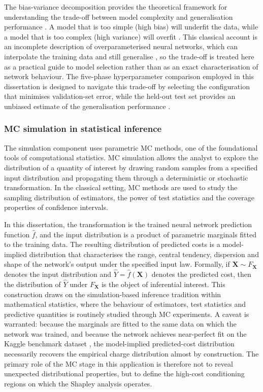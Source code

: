 The bias-variance decomposition provides the theoretical framework for
understanding the trade-off between model complexity and generalisation
performance \citep{hastie2009elements, james2021introduction}.  A model
that is too simple (high bias) will underfit the
data, while a model that is too complex (high variance) will overfit
\citep{abu2012learning, bishop2006pattern}.  This classical account is
an incomplete description of overparameterised neural networks, which can
interpolate the training data and still generalise
\citep{zhang2021understanding}, so the trade-off is treated here as a
practical guide to model selection rather than as an exact
characterisation of network behaviour.
The five-phase hyperparameter comparison employed in this dissertation is
designed to navigate this trade-off by selecting the configuration that
minimises validation-set error, while the held-out test set provides an
unbiased estimate of the generalisation performance
\citep{hastie2009elements, kadra2021welltuned}.

\subsubsection{MC simulation in statistical inference}
\label{sec:mc_intro}

The simulation component uses parametric MC methods, one of the
foundational tools of computational statistics.  MC simulation
allows the analyst to explore the distribution of a quantity of interest
by drawing random samples from a specified input distribution and
propagating them through a deterministic or stochastic transformation.
In the classical setting, MC methods are used to study the
sampling distribution of estimators, the power of test statistics and the
coverage properties of confidence intervals.

In this dissertation, the transformation is the trained neural network
prediction function $\hat{f}$, and the input distribution is a product of
parametric marginals fitted to the training data.  The resulting
distribution of predicted costs is a model-implied distribution that
characterises the range, central tendency, dispersion and shape of the
network's output under the specified input law.  Formally, if
$\mathbf{X} \sim F_{\mathbf{X}}$ denotes the input distribution and
$\hat{Y} = \hat{f}(\mathbf{X})$ denotes the predicted cost, then the
distribution of $\hat{Y}$ under $F_{\mathbf{X}}$ is the object of
inferential interest.  This construction draws on the simulation-based
inference tradition within mathematical statistics, where the behaviour
of estimators, test statistics and predictive quantities is routinely
studied through MC experiments.  A caveat is warranted: because
the marginals are fitted to the same data on which the network was
trained, and because the network achieves near-perfect fit on the
Kaggle benchmark dataset \citep{kaggleInsuranceDataML}, the model-implied predicted-cost distribution
necessarily recovers the empirical charge distribution almost by
construction.  The primary role of the MC stage in this
application is therefore not to reveal unexpected distributional
properties, but to define the high-cost conditioning regions on which
the Shapley analysis operates.


